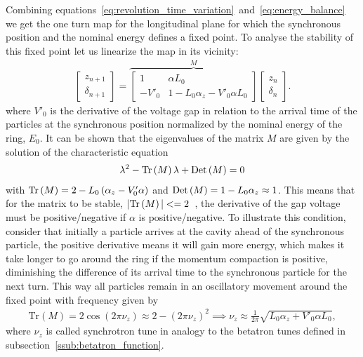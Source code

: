 	Combining equations~\eqref{eq:revolution_time_variation}~and~\eqref{eq:energy_balance} we get the one turn map for the longitudinal plane for which the synchronous position and the nominal energy defines a fixed point. To analyse the stability of this fixed point let us linearize the map in its vicinity:
	\begin{align}\label{eq:longitudinal_linear_map}
		\begin{bmatrix} z_{n+1} \\ \delta_{n+1}\end{bmatrix} = \overbrace{
			\begin{bmatrix}
                1 & \alpha L_0 \\
                -V'_0 & 1-L_0\alpha_z - V'_0\alpha L_0
            \end{bmatrix}
		}^M \begin{bmatrix} z_n \\ \delta_n \end{bmatrix}.
	\end{align}
	where $V'_0$ is the derivative of the voltage gap in relation to the arrival time of the particles at the synchronous position normalized by the nominal energy of the ring, $E_0$. It can be shown that the eigenvalues of the matrix $M$ are given by the solution of the characteristic equation
    \begin{align}
        \lambda^2 - \text{Tr}\left(M\right)\lambda + \text{Det}\left(M\right) = 0
    \end{align}
    with $\text{Tr}\left(M\right) = 2-L_0\left(\alpha_z-V'_0\alpha\right)$ and $\text{Det}\left(M\right) = 1-L_0\alpha_z\approx 1$. This means that for the matrix to be stable, $|\text{Tr}\left(M\right)| <= 2$~\cite{Courant1958}, the derivative of the gap voltage must be positive/negative if $\alpha$ is positive/negative. To illustrate this condition, consider that initially a particle arrives at the cavity ahead of the synchronous particle, the positive derivative means it will gain more energy, which makes it take longer to go around the ring if the momentum compaction is positive, diminishing the difference of its arrival time to the synchronous particle for the next turn. This way all particles remain in an oscillatory movement around the fixed point with frequency given by
	\begin{align}\label{eq:synchrotron_tune}
		\text{Tr}(M) = 2\cos(2\pi\nu_z) \approx 2-(2\pi\nu_z)^2 \implies
		\nu_z \approx \frac{1}{2\pi}\sqrt{L_0\alpha_z+V'_0\alpha L_0},
	\end{align}
	where $\nu_z$ is called synchrotron tune in analogy to the betatron tunes defined in subsection~\ref{ssub:betatron_function}.

